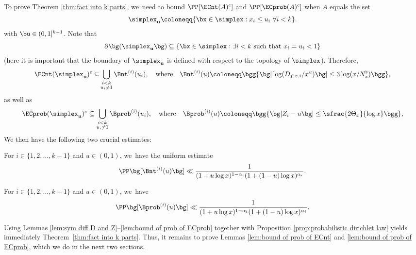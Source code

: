 To prove Theorem \ref{thm:fact into k parts}, we~need to bound $\PP[\ECnt(A)^c]$ and $\PP[\ECprob(A)^c]$ when $A$ equals the set
\[
\simplex_{\mathbf{u}} \coloneqq \{\bx\in \simplex: x_i\le u_i\ \forall i<k\}.
\]
with $\bu\in(0,1]^{k-1}$. Note that
\[
\partial \bg(\simplex_{\mathbf{u}}\bg) \subseteq \{\bx \in \simplex : \exists i < k \text{ such that } x_i = u_i < 1\}
\]
(here it is important that the boundary of $\simplex_{\mathbf{u}}$ is defined with respect to the topology of $\simplex$). Therefore,
\[
\ECnt(\simplex_{\mathbf{u}})^c\subseteq\! \bigcup_{\substack{i<k \\ u_i\neq 1}} \Bnt^{(i)}(u_i),
\quad\text{where}\quad
\Bnt^{(i)}(u) \coloneqq \bgg\{ \bg| \log(D_{f,x,i}/x^u)\bg|\le 3\log(x/N_x^\flat) \bgg\},
\]
as well as
\[
\ECprob(\simplex_{\mathbf{u}})^c\subseteq \bigcup_{\substack{i< k \\ u_i\neq 1}} \Bprob^{(i)}(u_i),
\quad\text{where}\quad
\Bprob^{(i)}(u) \coloneqq \bgg\{ \bg| Z_i - u \bg|\le \sfrac{2\Theta_x}{\log x} \bgg\},
\]
We then have the following two crucial estimates:

\begin{lem}
\label{lem:bound of prob of ECnt}
For $i\in\{1,2,\dots,k-1\}$ and $u\in(0,1)$, we~have the uniform estimate
\[
\PP\bg[\Bnt^{(i)}(u) \bg] \ll \frac{1}{(1+ u\log x)^{1-\alpha_i}(1+(1-u)\log x)^{\alpha_i}}.
\]
\end{lem}

\begin{lem}
\label{lem:bound of prob of ECprob}
For $i\in\{1,2,\dots,k-1\}$ and $u\in(0,1)$, we~have
\[
\PP\bg[\Bprob^{(i)}(u) \bg] \ll \frac{1}{(1+ u\log x)^{1-\alpha_i}(1+(1-u)\log x)^{\alpha_i}}.
\]
\end{lem}

Using Lemmas \ref{lem:sym diff D and Z}--\ref{lem:bound of prob of ECprob} together with Proposition \ref{prop:probabilistic dirichlet law} yields immediately Theorem~\ref{thm:fact into k parts}. Thus, it remains to prove Lemmas \ref{lem:bound of prob of ECnt} and \ref{lem:bound of prob of ECprob}, which we do in the next two sections.

